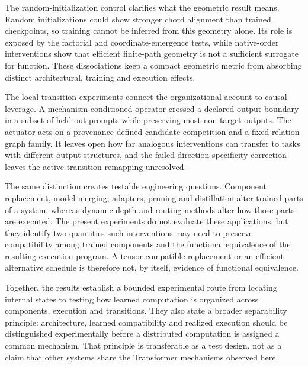 \documentclass[12pt]{article}
\begin{document}
The random-initialization control clarifies what the geometric result means. Random initializations could show stronger chord alignment than trained checkpoints, so training cannot be inferred from this geometry alone. Its role is exposed by the factorial and coordinate-emergence tests, while native-order interventions show that efficient finite-path geometry is not a sufficient surrogate for function. These dissociations keep a compact geometric metric from absorbing distinct architectural, training and execution effects.

The local-transition experiments connect the organizational account to causal leverage. A mechanism-conditioned operator crossed a declared output boundary in a subset of held-out prompts while preserving most non-target outputs. The actuator acts on a provenance-defined candidate competition and a fixed relation-graph family. It leaves open how far analogous interventions can transfer to tasks with different output structures, and the failed direction-specificity correction leaves the active transition remapping unresolved.

The same distinction creates testable engineering questions. Component replacement, model merging, adapters, pruning and distillation alter trained parts of a system, whereas dynamic-depth and routing methods alter how those parts are executed. The present experiments do not evaluate these applications, but they identify two quantities such interventions may need to preserve: compatibility among trained components and the functional equivalence of the resulting execution program. A tensor-compatible replacement or an efficient alternative schedule is therefore not, by itself, evidence of functional equivalence.

Together, the results establish a bounded experimental route from locating internal states to testing how learned computation is organized across components, execution and transitions. They also state a broader separability principle: architecture, learned compatibility and realized execution should be distinguished experimentally before a distributed computation is assigned a common mechanism. That principle is transferable as a test design, not as a claim that other systems share the Transformer mechanisms observed here.
\end{document}

